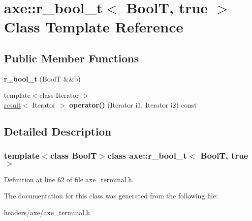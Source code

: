 \hypertarget{classaxe_1_1r__bool__t_3_01BoolT_00_01true_01_4}{\section{axe\+:\+:r\+\_\+bool\+\_\+t$<$ Bool\+T, true $>$ Class Template Reference}
\label{classaxe_1_1r__bool__t_3_01BoolT_00_01true_01_4}
}
\subsection*{Public Member Functions}
\begin{DoxyCompactItemize}
\item 
\hypertarget{classaxe_1_1r__bool__t_3_01BoolT_00_01true_01_4_a78569aa3454ae42ae6d90ab113706191}{{\bfseries r\+\_\+bool\+\_\+t} (Bool\+T \&\&b)}\label{classaxe_1_1r__bool__t_3_01BoolT_00_01true_01_4_a78569aa3454ae42ae6d90ab113706191}

\item 
\hypertarget{classaxe_1_1r__bool__t_3_01BoolT_00_01true_01_4_a1b5ff946ecaf9eb9950fbe7c22fa91ce}{{\footnotesize template$<$class Iterator $>$ }\\\hyperlink{structaxe_1_1result}{result}$<$ Iterator $>$ {\bfseries operator()} (Iterator i1, Iterator i2) const }\label{classaxe_1_1r__bool__t_3_01BoolT_00_01true_01_4_a1b5ff946ecaf9eb9950fbe7c22fa91ce}

\end{DoxyCompactItemize}


\subsection{Detailed Description}
\subsubsection*{template$<$class Bool\+T$>$class axe\+::r\+\_\+bool\+\_\+t$<$ Bool\+T, true $>$}



Definition at line 62 of file axe\+\_\+terminal.\+h.



The documentation for this class was generated from the following file\+:\begin{DoxyCompactItemize}
\item 
headers/axe/axe\+\_\+terminal.\+h\end{DoxyCompactItemize}
